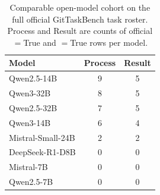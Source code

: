 \begin{table}[t]
\caption{Comparable open-model cohort on the full official GitTaskBench task roster. Process and Result are counts of official \processmetric$=$True and \resultmetric$=$True rows per model.}
\label{tab:model-summary}
\centering
\small
\begin{tabular}{lcc}
\toprule
\rowcolor{cyan!12}
Model & Process & Result \\
\midrule
\rowcolors{2}{cyan!4}{white}
Qwen2.5-14B & 9 & 5 \\
Qwen3-32B & 8 & 5 \\
Qwen2.5-32B & 7 & 5 \\
Qwen3-14B & 6 & 4 \\
Mistral-Small-24B & 2 & 2 \\
DeepSeek-R1-D8B & 0 & 0 \\
Mistral-7B & 0 & 0 \\
Qwen2.5-7B & 0 & 0 \\
\bottomrule
\end{tabular}
\end{table}
